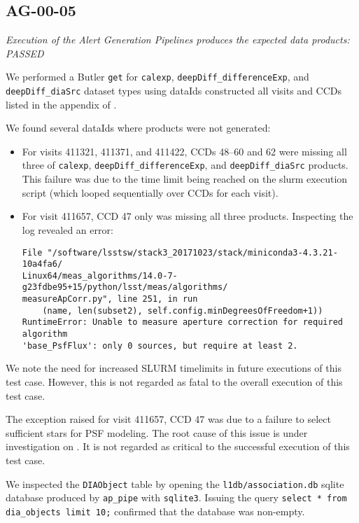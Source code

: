 \documentclass[DM,lsstdraft,STR,toc]{lsstdoc}
\begin{document}
\subsection{AG-00-05}
\label{sect:ag-00-05}

\textit{Execution of the Alert Generation Pipelines produces the expected data products: PASSED}

We performed a Butler \texttt{get} for \texttt{calexp}, \texttt{deepDiff\_differenceExp}, and \texttt{deepDiff\_diaSrc} dataset types using dataIds constructed all visits and CCDs listed in the appendix of .

We found several dataIds where products were not generated:

\begin{itemize}
    \item For visits 411321, 411371, and 411422, CCDs 48--60 and 62 were missing all three of \texttt{calexp}, \texttt{deepDiff\_differenceExp}, and \texttt{deepDiff\_diaSrc} products.  This failure was due to the time limit being reached on the slurm execution script (which looped sequentially over CCDs for each visit).
    \item For visit 411657, CCD 47 only was missing all three products.  Inspecting the log revealed an error:
        \begin{verbatim}
File "/software/lsstsw/stack3_20171023/stack/miniconda3-4.3.21-10a4fa6/
Linux64/meas_algorithms/14.0-7-g23fdbe95+15/python/lsst/meas/algorithms/
measureApCorr.py", line 251, in run
    (name, len(subset2), self.config.minDegreesOfFreedom+1))
RuntimeError: Unable to measure aperture correction for required algorithm
'base_PsfFlux': only 0 sources, but require at least 2.
\end{verbatim}
\end{itemize}

We note the need for increased SLURM timelimits in future executions of this
test case. However, this is not regarded as fatal to the overall execution
of this test case.

The exception raised for visit 411657, CCD 47 was due to a failure to select
sufficient stars for PSF modeling. The root cause of this issue is under
investigation on . It is not regarded as critical to the
successful execution of this test case.

We inspected the \texttt{DIAObject} table by opening the
\texttt{l1db/association.db} sqlite database produced by \texttt{ap\_pipe}
with \texttt{sqlite3}. Issuing the query \texttt{select * from dia\_objects limit 10;} confirmed that the database was non-empty.
\end{document}
